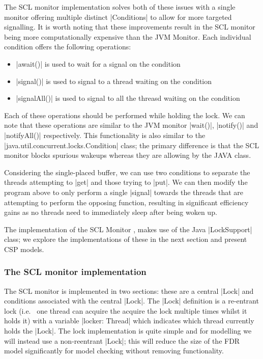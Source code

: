 The SCL monitor implementation solves both of these issues with a single monitor offering multiple distinct |Conditions| to allow for more targeted signalling. It is worth noting that these improvements result in the SCL monitor being more computationally expensive than the JVM Monitor. Each individual condition offers the following operations:
\begin{itemize}
  \item |await()| is used to wait for a signal on the condition
  \item |signal()| is used to signal to a thread waiting on the condition
  \item |signalAll()| is used to signal to all the threasd waiting on the condition
\end{itemize}
Each of these operations should be performed while holding the lock. We can note that these operations are similar to the JVM monitor |wait()|, |notify()| and |notifyAll()| respectively. This functionality is also similar to the |java.util.concurrent.locks.Condition| class; the primary difference is that the SCL monitor blocks spurious wakeups whereas they are allowing by the JAVA class.

Considering the single-placed buffer, we can use two conditions to separate the threads attempting to |get| and those trying to |put|. We can then modify the program above to only perform a single |signal| towards the threads that are attempting to perform the opposing function, resulting in significant efficiency gains as no threads need to immediately sleep after being woken up.

The implementation of the SCL Monitor \cite{GitHub}, makes use of the Java |LockSupport| class; we explore the implementations of these in the next section and present CSP models.  

\subsubsection{The SCL monitor implementation}

The SCL monitor is implemented in two sections: these are a central |Lock| and conditions associated with the central |Lock|. The |Lock| definition is a re-entrant lock (i.e.~ one thread can acquire the acquire the lock multiple times whilst it holds it) with a variable |locker: Thread| which indicates which thread currently holds the |Lock|. The lock implementation is quite simple and for modelling we will instead use a non-reentrant |Lock|; this will reduce the size of the FDR model significantly for model checking without removing functionality.


